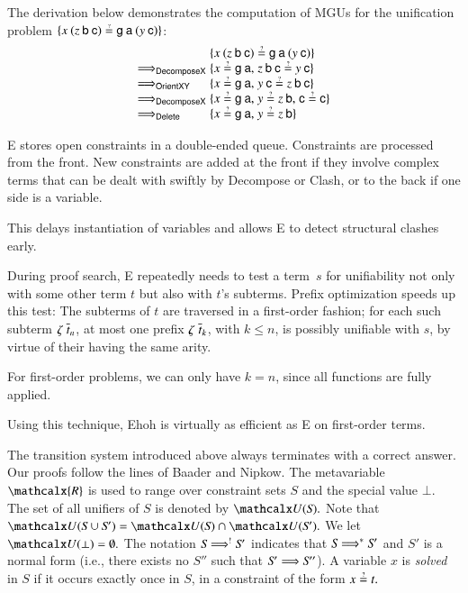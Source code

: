 The derivation below demonstrates the computation of MGUs for the
unification problem
$\{x \> (z \> \cst{b} \> \cst{c}) \unif \cst{g} \> \cst{a} \> (y \> \cst{c})\}$:
%
\begin{align*}
& \{ \relax{x \> (z \> \cst{b} \> \cst{c})  \unif  \cst{g} \>  \cst{a} \>  (y \> \cst{c})}\}
\\[-1\jot]
\unifARROW{\textsf{DecomposeX}}
& \{ \relax{x \unif \cst{g} \> \cst{a}}{,}\; z \> \cst{b} \> \cst{c} \unif y \> \cst{c} \}
\\[-1\jot]
\unifARROW{\textsf{OrientXY}}
& \{ x \unif \cst{g} \> \cst{a}{,}\; \relax{y \> \cst{c} \unif z \> \cst{b} \> \cst{c}} \}
\\[-1\jot]
\unifARROW{\textsf{DecomposeX}}
& \{ x \unif \cst{g} \> \cst{a}{,}\; \relax{y  \unif z \> \cst{b}}{,}\;  \cst{c} \unif  \cst{c} \}
\\[-1\jot]
\unifARROW{\textsf{Delete}}
& \{ x \unif \cst{g} \> \cst{a}{,}\; y  \unif z \> \cst{b} \}
\end{align*}

E stores open constraints in a double-ended
queue. Constraints are processed from the front. New constraints are
added at the front if they involve complex
terms that can be dealt with swiftly by \textsf{Decompose} or
\textsf{Clash}, or to the back if one side is a variable. \begin{rep}This
delays instantiation of variables %
and allows E to detect structural clashes early. \end{rep}%

During proof search, E repeatedly needs to test a term~$s$ for unifiability
not only with some other term $t$ but also with $t$'s subterms.
Prefix optimization speeds up this test: The subterms of $t$ are
traversed in a first-order fashion; for each such subterm $\zeta \;
\overline{t}_{n}$, at most one prefix $\zeta \;
\overline{t}_{k}$, with $k \le n$, is possibly unifiable with $s$, by virtue
of their having the same arity. \begin{rep}For first-order problems, we can only have $k =
n$, since all functions are fully applied. \end{rep}Using this technique, Ehoh
is virtually as efficient as E on first-order terms.

  The transition system introduced above always terminates with a correct
  answer. Our proofs follow the lines of Baader and Nipkow.
  The metavariable $\mathcalx{R}$ is used to range over constraint sets $\mathit{S}$
  and the special value $\bot.$
  The set of all unifiers of $\mathit{S}$ is denoted by $\Unifier(\mathit{S}).$
  Note that $\Unifier(\mathit{S} \cup \mathit{S}') = \Unifier(\mathit{S}) \cap \Unifier(\mathit{S}').$
  We let $\Unifier(\bot) = \emptyset.$
  The notation $\mathit{S} \Longrightarrow^{!} \mathit{S}'$ indicates that $\mathit{S}
  \Longrightarrow^{*} \mathit{S}'$ and $\mathit{S}'$ is a normal form (i.e., there exists no
  $\mathit{S}''$ such that $\mathit{S}' \Longrightarrow \mathit{S}''$).
  A variable $x$ is \emph{solved} in $\mathit{S}$
  if it occurs exactly once in $\mathit{S}$, in a constraint of the form $x \unif t.$

